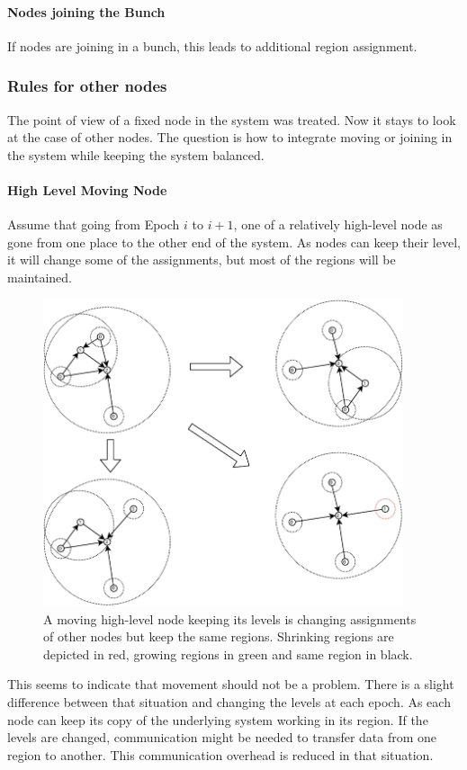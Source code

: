 \documentclass[a4paper,11pt,oneside]{report}
\begin{document}
\paragraph{Nodes joining the Bunch} 
If nodes are joining in a bunch, this leads to additional region assignment. 

\subsubsection{Rules for other nodes}
The point of view of a fixed node in the system was treated. Now it stays to look at the case of other nodes. The
question is how to integrate moving or joining in the system while keeping the system
balanced. 

\paragraph{High Level Moving Node}
Assume that going from Epoch $i$ to $i+1$, one of a relatively high-level node
as gone from one place to the other end of the system. As nodes can keep their
level, it will change some of the assignments, but most of the regions will be
maintained. 

\begin{figure}[!h] 
\centering
\includegraphics[width=300pt]{figures/LocarnoTreaties-Moving}
\caption{A moving high-level node keeping its levels is changing assignments of other
    nodes but keep the same regions. Shrinking regions are depicted in red,
    growing regions in green and same region in black. }
\label{fig:LocarnoTreaties-Moving}
\end{figure}

This seems to indicate that movement should not be a problem. There is a
slight difference between that situation and changing the levels at each
epoch. As each node can keep its copy of the underlying system working in its
region. If the levels are changed, communication might be needed to transfer
data from one region to another. This communication overhead is reduced in
that situation. 
\end{document}

